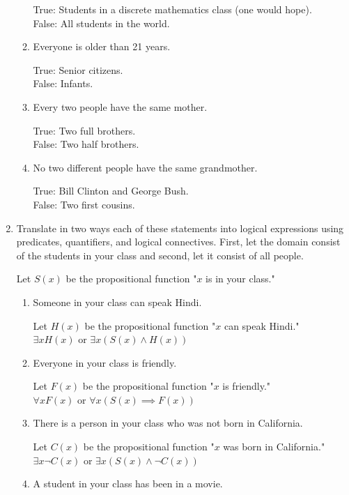 \documentclass[11pt]{article}
\begin{document}
\begin{enumerate}[label=\textbf{\arabic*.}]
\begin{enumerate}[label=\textbf{\alph*)}]
		True: Students in a discrete mathematics class (one would hope). \\
		False: All students in the world.
		
		\item Everyone is older than 21 years.
		
		True: Senior citizens. \\
		False: Infants.
		
		\item Every two people have the same mother.
		
		True: Two full brothers. \\
		False: Two half brothers.
		
		\item No two different people have the same grandmother.
		
		True: Bill Clinton and George Bush. \\
		False: Two first cousins.
	\end{enumerate}

	\item Translate in two ways each of these statements into logical expressions using predicates, quantifiers, and logical connectives. First, let the domain consist of the students in your class and second, let it consist of all people.
	
	Let $S(x)$ be the propositional function "$x$ is in your class."
	\begin{enumerate}[label=\textbf{\alph*)}]
		\item Someone in your class can speak Hindi.
		
		Let $H(x)$ be the propositional function "$x$ can speak Hindi." \\
		$\exists xH(x)$ or $\exists x(S(x) \land H(x))$
		
		\item Everyone in your class is friendly.
		
		Let $F(x)$ be the propositional function "$x$ is friendly." \\
		$\forall xF(x)$ or $\forall x(S(x) \implies F(x))$
		
		\item There is a person in your class who was not born in California.
		
		Let $C(x)$ be the propositional function "$x$ was born in California." \\
		$\exists x\neg C(x)$ or $\exists x(S(x) \land \neg C(x))$
		
		\item A student in your class has been in a movie.
		

\end{enumerate}
\end{enumerate}
\end{document}
